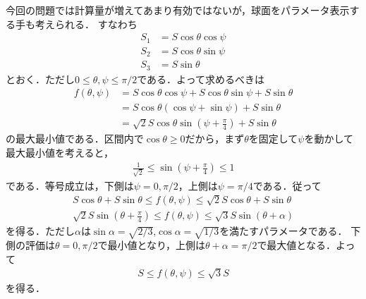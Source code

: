 \documentclass[a4paper,10pt]{ltjsarticle}
\begin{document}
\begin{multicols}{2}
  今回の問題では計算量が増えてあまり有効ではないが，球面をパラメータ表示する手も考えられる．
  すなわち
  \begin{align*}
    S_1 & = S\cos\theta\cos\psi \\
    S_2 & = S\cos\theta\sin\psi \\
    S_3 & = S\sin\theta
  \end{align*}
  とおく．ただし$0\le\theta,\psi\le\pi/2$である．よって求めるべきは
  \begin{align*}
    f(\theta,\psi)
     & = S\cos\theta\cos\psi+S\cos\theta\sin\psi+S\sin\theta                  \\
     & = S\cos\theta\left(\cos\psi+\sin\psi\right)+S\sin\theta                \\
     & = \sqrt{2}S\cos\theta\sin\left(\psi+\frac{\pi}{4}\right) + S\sin\theta
  \end{align*}
  の最大最小値である．区間内で$\cos\theta\ge 0$だから，まず$\theta$を固定して$\psi$を動かして
  最大最小値を考えると，
  \begin{align*}
    \frac{1}{\sqrt{2}} \le \sin\left(\psi+\frac{\pi}{4}\right) \le 1
  \end{align*}
  である．等号成立は，下側は$\psi=0,\pi/2$，上側は$\psi=\pi/4$である．従って
  \begin{align*}
    S\cos\theta + S\sin\theta \le f(\theta,\psi) \le \sqrt{2}S\cos\theta + S\sin\theta \\
    \sqrt{2}S\sin\left(\theta+\frac{\pi}{4}\right) \le f(\theta,\psi) \le \sqrt{3}S\sin(\theta+\alpha)
  \end{align*}
  を得る．ただし$\alpha$は$\sin\alpha=\sqrt{2/3}$,$\cos\alpha=\sqrt{1/3}$を満たすパラメータである．
  下側の評価は$\theta=0,\pi/2$で最小値となり，上側は$\theta+\alpha=\pi/2$で最大値となる．よって
  \begin{align*}
    S \le f(\theta,\psi) \le \sqrt{3} S
  \end{align*}
  を得る．



  \newpage
\end{multicols}
\end{document}
